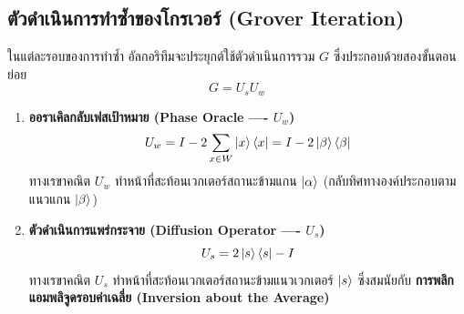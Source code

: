 \subsection{ตัวดำเนินการทำซ้ำของโกรเวอร์ (Grover Iteration)}
ในแต่ละรอบของการทำซ้ำ อัลกอริทึมจะประยุกต์ใช้ตัวดำเนินการรวม $G$ ซึ่งประกอบด้วยสองขั้นตอนย่อย
\begin{equation}
G = U_s U_w
\label{eq:grover_operator_def}
\end{equation}
\begin{enumerate}
    \item \textbf{ออราเคิลกลับเฟสเป้าหมาย (Phase Oracle ---- $U_w$)}
    \begin{equation}
    U_w = I - 2\sum_{x \in W} \ket{x}\bra{x} = I - 2\ket{\beta}\bra{\beta}
    \end{equation}
    ทางเรขาคณิต $U_w$ ทำหน้าที่สะท้อนเวกเตอร์สถานะข้ามแกน $\ket{\alpha}$ (กลับทิศทางองค์ประกอบตามแนวแกน $\ket{\beta}$)
    \item \textbf{ตัวดำเนินการแพร่กระจาย (Diffusion Operator ---- $U_s$)}
    \begin{equation}
    U_s = 2\ket{s}\bra{s} - I
    \end{equation}
    ทางเรขาคณิต $U_s$ ทำหน้าที่สะท้อนเวกเตอร์สถานะข้ามแนวเวกเตอร์ $\ket{s}$ ซึ่งสมนัยกับ \textbf{การพลิกแอมพลิจูดรอบค่าเฉลี่ย (Inversion about the Average)}
\end{enumerate}

